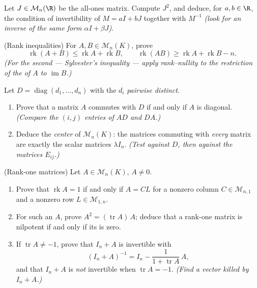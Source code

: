 \begin{exercise}[$\star\star\star$]\label{exo:b1:matrices:9}
Let $J \in \mathcal{M}_n(\R)$ be the all-ones matrix. Compute $J^2$,
and deduce, for $a, b \in \R$, the condition of invertibility of $M
= aI + bJ$ together with $M^{-1}$ \emph{(look for an inverse of the
same form $\alpha I + \beta J$)}.
\end{exercise}

\begin{exercise}[$\star\star\star$]\label{exo:b1:matrices:10}
(Rank inequalities) For $A, B \in \mathcal{M}_n(K)$, prove
\[
\operatorname{rk}(A + B) \leq \operatorname{rk} A +
\operatorname{rk} B,
\qquad
\operatorname{rk}(AB) \geq \operatorname{rk} A + \operatorname{rk}
B - n .
\]
\emph{(For the second --- Sylvester's inequality --- apply
rank--nullity to the restriction of the  of $A$ to
$\operatorname{im} B$.)}
\end{exercise}

\begin{exercise}[$\star\star$]\label{exo:b1:matrices:11}
Let $D = \operatorname{diag}(d_1, \dots, d_n)$ with the $d_i$
\emph{pairwise distinct}.
\begin{enumerate}
  \item Prove that a matrix $A$ commutes with $D$ if and only if
        $A$ is diagonal. \emph{(Compare the $(i,j)$ entries of
        $AD$ and $DA$.)}
  \item Deduce the \emph{center} of $\mathcal{M}_n(K)$: the
        matrices commuting with \emph{every} matrix are exactly
        the scalar matrices $\lambda I_n$. \emph{(Test against
        $D$, then against the matrices $E_{ij}$.)}
\end{enumerate}
\end{exercise}

\begin{exercise}[$\star\star\star$]\label{exo:b1:matrices:12}
(Rank-one matrices) Let $A \in \mathcal{M}_n(K)$, $A \neq 0$.
\begin{enumerate}
  \item Prove that $\operatorname{rk} A = 1$ if and only if $A =
        CL$ for a nonzero column $C \in \mathcal{M}_{n,1}$ and a
        nonzero row $L \in \mathcal{M}_{1,n}$.
  \item For such an $A$, prove $A^2 = (\operatorname{tr} A)\,A$;
        deduce that a rank-one matrix is nilpotent if and only if
        its  is zero.
  \item If $\operatorname{tr} A \neq -1$, prove that $I_n + A$ is
        invertible with
        \[
        (I_n + A)^{-1} = I_n - \frac{1}{1 + \operatorname{tr}
        A}\,A ,
        \]
        and that $I_n + A$ is \emph{not} invertible when
        $\operatorname{tr} A = -1$. \emph{(Find a vector killed
        by $I_n + A$.)}
\end{enumerate}
\end{exercise}

